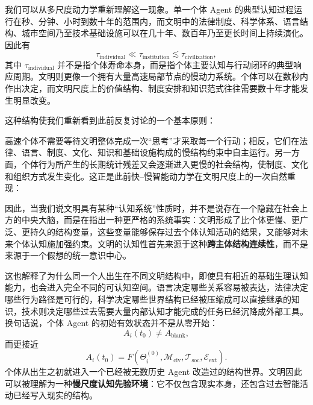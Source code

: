 我们可以从多尺度动力学重新理解这一现象。单一个体 Agent 的典型认知过程运行在秒、分钟、小时到数十年的范围内，而文明中的法律制度、科学体系、语言结构、城市空间乃至技术基础设施可以在几十年、数百年乃至更长时间上持续演化。因此有
\[
\tau_{\mathrm{individual}}
\ll
\tau_{\mathrm{institution}}
\lesssim
\tau_{\mathrm{civilization}},
\]
其中 $\tau_{\mathrm{individual}}$ 并不是指个体寿命本身，而是指个体主要认知与行动闭环的典型响应周期。文明则更像一个拥有大量高速局部节点的慢动力系统。个体可以在数秒内作出决定，而文明尺度上的价值结构、制度安排和知识范式往往需要数十年才能发生明显改变。

这种结构使我们重新看到此前反复讨论的一个基本原则：
\begin{statementbox}
\centering
{}
\end{statementbox}
高速个体不需要等待文明整体完成一次“思考”才采取每一个行动；相反，它们在法律、语言、制度、文化、知识和基础设施构成的慢结构约束中自主运行。另一方面，个体行为所产生的长期统计残差又会逐渐进入更慢的社会结构，使制度、文化和组织方式发生变化。这正是此前快--慢智能动力学在文明尺度上的一次自然重现：
\begin{statementbox}
\centering
{}
\end{statementbox}

因此，当我们说文明具有某种“认知系统”性质时，并不是说存在一个隐藏在社会上方的中央大脑，而是在指出一种更严格的系统事实：文明形成了比个体更慢、更广泛、更持久的结构变量，这些变量能够保存过去个体认知活动的结果，又能够对未来个体认知施加强约束。文明的认知性首先来源于这种\textbf{跨主体结构连续性}，而不是来源于一个假想的统一意识中心。

这也解释了为什么同一个人出生在不同文明结构中，即使具有相近的基础生理认知能力，也会进入完全不同的可认知空间。语言决定哪些关系容易被表达，法律决定哪些行为路径是可行的，科学决定哪些世界结构已经被压缩成可以直接继承的知识，技术则决定哪些过去需要大量内部认知才能完成的任务已经沉降成外部工具。换句话说，个体 Agent 的初始有效状态并不是从零开始：
\[
A_i(t_0)
\neq
A_{\mathrm{blank}},
\]
而更接近
\[
A_i(t_0)
=
F\!\left(
\Theta_i^{(0)},
\mathcal M_{\mathrm{civ}},
\mathcal T_{\mathrm{soc}},
\mathcal E_{\mathrm{ext}}
\right).
\]
个体从出生之初就进入一个已经被无数历史 Agent 改造过的结构世界。文明因此可以被理解为一种\textbf{慢尺度认知先验环境}：它不仅包含现实本身，还包含过去智能活动已经写入现实的结构。

